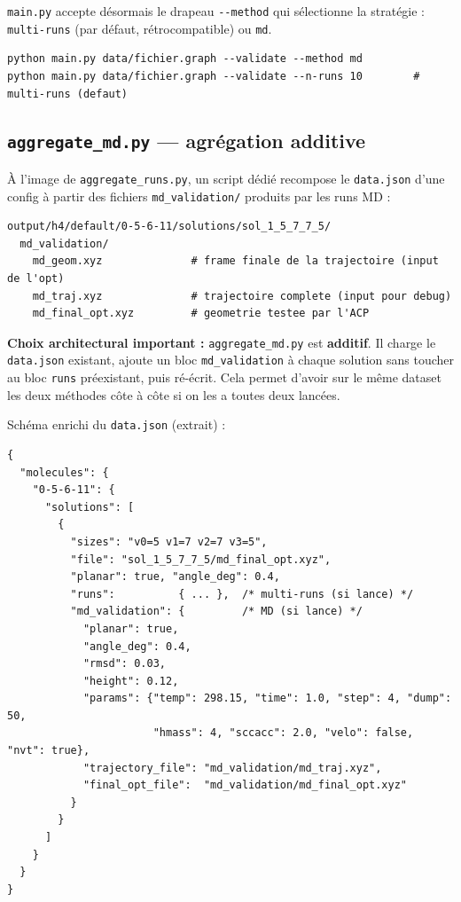 \documentclass[12pt,a4paper]{article}
\theoremstyle{definition}
\begin{document}
\texttt{main.py} accepte désormais le drapeau \texttt{-{}-method} qui sélectionne la stratégie :
\texttt{multi-runs} (par défaut, rétrocompatible) ou \texttt{md}.

\begin{lstlisting}[style=benzai]
python main.py data/fichier.graph --validate --method md
python main.py data/fichier.graph --validate --n-runs 10        # multi-runs (defaut)
\end{lstlisting}

\subsection{\texttt{aggregate\_md.py} — agrégation additive}

À l'image de \texttt{aggregate\_runs.py}, un script dédié recompose le \texttt{data.json}
d'une config à partir des fichiers \texttt{md\_validation/} produits par les runs MD :

\begin{lstlisting}[style=benzai]
output/h4/default/0-5-6-11/solutions/sol_1_5_7_7_5/
  md_validation/
    md_geom.xyz              # frame finale de la trajectoire (input de l'opt)
    md_traj.xyz              # trajectoire complete (input pour debug)
    md_final_opt.xyz         # geometrie testee par l'ACP
\end{lstlisting}

\textbf{Choix architectural important :} \texttt{aggregate\_md.py} est \textbf{additif}. Il
charge le \texttt{data.json} existant, ajoute un bloc \texttt{md\_validation} à chaque
solution sans toucher au bloc \texttt{runs} préexistant, puis ré-écrit. Cela permet d'avoir
sur le même dataset les deux méthodes côte à côte si on les a toutes deux lancées.

Schéma enrichi du \texttt{data.json} (extrait) :

\begin{lstlisting}[style=benzai]
{
  "molecules": {
    "0-5-6-11": {
      "solutions": [
        {
          "sizes": "v0=5 v1=7 v2=7 v3=5",
          "file": "sol_1_5_7_7_5/md_final_opt.xyz",
          "planar": true, "angle_deg": 0.4,
          "runs":          { ... },  /* multi-runs (si lance) */
          "md_validation": {         /* MD (si lance) */
            "planar": true,
            "angle_deg": 0.4,
            "rmsd": 0.03,
            "height": 0.12,
            "params": {"temp": 298.15, "time": 1.0, "step": 4, "dump": 50,
                       "hmass": 4, "sccacc": 2.0, "velo": false, "nvt": true},
            "trajectory_file": "md_validation/md_traj.xyz",
            "final_opt_file":  "md_validation/md_final_opt.xyz"
          }
        }
      ]
    }
  }
}
\end{lstlisting}
\end{document}
